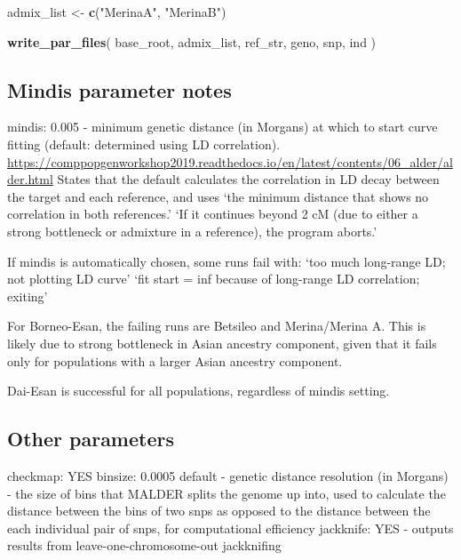 \documentclass[
]{article}
\newenvironment{Shaded}{\begin{snugshade}}{\end{snugshade}}
\newcommand{\FunctionTok}[1]{\textcolor[rgb]{0.13,0.29,0.53}{\textbf{#1}}}
\newcommand{\NormalTok}[1]{#1}
\newcommand{\OtherTok}[1]{\textcolor[rgb]{0.56,0.35,0.01}{#1}}
\newcommand{\StringTok}[1]{\textcolor[rgb]{0.31,0.60,0.02}{#1}}
\begin{document}
\begin{Shaded}
\begin{Highlighting}[]
\NormalTok{admix\_list }\OtherTok{\textless{}{-}} \FunctionTok{c}\NormalTok{(}\StringTok{"MerinaA"}\NormalTok{, }\StringTok{"MerinaB"}\NormalTok{)}

\FunctionTok{write\_par\_files}\NormalTok{(}
\NormalTok{  base\_root,}
\NormalTok{  admix\_list,}
\NormalTok{  ref\_str,}
\NormalTok{  geno,}
\NormalTok{  snp,}
\NormalTok{  ind}
\NormalTok{)}
\end{Highlighting}
\end{Shaded}

\subsection{Mindis parameter notes}\label{mindis-parameter-notes}

mindis: 0.005 - minimum genetic distance (in Morgans) at which to start
curve fitting (default: determined using LD correlation).
\url{https://comppopgenworkshop2019.readthedocs.io/en/latest/contents/06_alder/alder.html}
States that the default calculates the correlation in LD decay between
the target and each reference, and uses `the minimum distance that shows
no correlation in both references.' `If it continues beyond 2 cM (due to
either a strong bottleneck or admixture in a reference), the program
aborts.'

If mindis is automatically chosen, some runs fail with: `too much
long-range LD; not plotting LD curve' `fit start = inf because of
long-range LD correlation; exiting'

For Borneo-Esan, the failing runs are Betsileo and Merina/Merina A. This
is likely due to strong bottleneck in Asian ancestry component, given
that it fails only for populations with a larger Asian ancestry
component.

Dai-Esan is successful for all populations, regardless of mindis
setting.

\subsection{Other parameters}\label{other-parameters}

checkmap: YES binsize: 0.0005 default - genetic distance resolution (in
Morgans) - the size of bins that MALDER splits the genome up into, used
to calculate the distance between the bins of two snps as opposed to the
distance between the each individual pair of snps, for computational
efficiency jackknife: YES - outputs results from
leave-one-chromosome-out jackknifing
\end{document}
